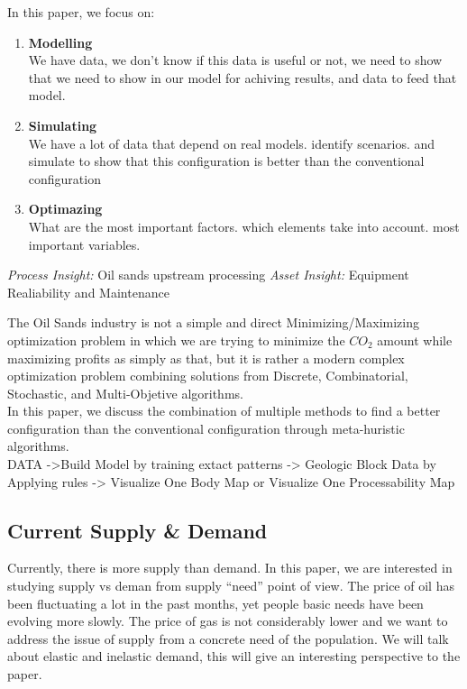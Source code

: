 \documentclass[12pt]{article}
\begin{document}
In this paper, we focus on: 
\begin{enumerate}
\item {\bf Modelling} \\
We have data, we don't know if this data is useful or not, we need to show that we
need to show in our model for achiving results, and data to feed that model. 
\item {\bf Simulating} \\
We have a lot of data that depend on real models. identify scenarios. and simulate to 
show that this configuration is better than the conventional configuration 
\item {\bf Optimazing} \\
What are the most important factors. which elements take into account. most important
variables. \\
\end{enumerate}

{\em Process Insight:} Oil sands upstream processing
{\em Asset Insight:} Equipment Realiability and Maintenance

The Oil Sands industry is not a simple and direct Minimizing/Maximizing optimization problem in which we are trying to minimize the $CO_2$ amount while maximizing profits as simply as that, but it is rather a modern complex optimization problem combining solutions from Discrete, Combinatorial, Stochastic, and Multi-Objetive algorithms. \\

In this paper, we discuss the combination of multiple methods to find a better configuration than the conventional configuration through meta-huristic algorithms. \\

DATA ->Build Model  by training extact patterns -> Geologic Block Data by Applying rules -> Visualize One Body Map or Visualize One Processability Map

\subsection{Current Supply \& Demand}

Currently, there is more supply than demand. In this paper, we are interested in studying supply vs deman from supply ``need'' point of view. The price of oil has been fluctuating a lot in the past months, yet people basic needs have been evolving more slowly. The price of gas is not considerably lower and we want to address the issue of  supply from a concrete need of the population. We will talk about elastic and inelastic demand, this will give an interesting perspective to the paper. \\
\end{document}
